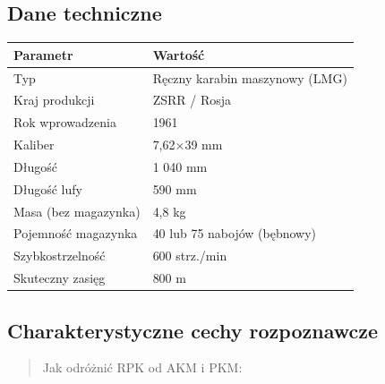 \documentclass[12pt,oneside]{book}
\begin{document}
\subsection{Dane techniczne}\label{dane-techniczne-69}

\begin{longtable}[]{@{}ll@{}}
\toprule\noalign{}
Parametr & Wartość \\
\midrule\noalign{}
\endhead
\bottomrule\noalign{}
\endlastfoot
Typ & Ręczny karabin maszynowy (LMG) \\
Kraj produkcji & ZSRR / Rosja \\
Rok wprowadzenia & 1961 \\
Kaliber & 7,62×39 mm \\
Długość & 1 040 mm \\
Długość lufy & 590 mm \\
Masa (bez magazynka) & 4,8 kg \\
Pojemność magazynka & 40 lub 75 nabojów (bębnowy) \\
Szybkostrzelność & 600 strz./min \\
Skuteczny zasięg & 800 m \\
\end{longtable}

\subsection{Charakterystyczne cechy
rozpoznawcze}\label{charakterystyczne-cechy-rozpoznawcze-69}

\begin{quote}
Jak odróżnić RPK od AKM i PKM:
\end{quote}
\end{document}
